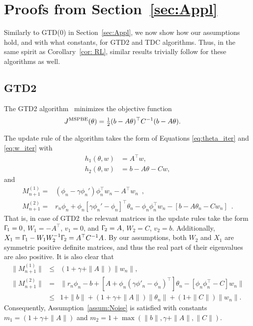 \documentclass[usenames,dvipsnames,final,12pt]{colt2018} %
\newcommand{\bE}{\mathbb{E}}
\newcommand{\Xt}{X_1}
\newcommand{\Wt}{W_1}
\newcommand{\Tt}{\Upgamma_1}
\newcommand{\Mt}{M^{(1)}}
\newcommand{\mt}{m_1}
\newcommand{\Tw}{\Upgamma_2}
\newcommand{\Ww}{W_2}
\newcommand{\Mw}{M^{(2)}}
\newcommand{\mw}{m_2}
\newcommand{\gal}[1]{#1}
\begin{document}
\section{Proofs from Section~\ref{sec:Appl}} \label{sec: RL appendix}
\gal{Similarly to GTD(0) in Section~\ref{sec:Appl}, we now show how our assumptions hold, and with what constants, for GTD2 and TDC algorithms. Thus, in the same spirit as Corollary~\ref{cor: RL}, similar results trivially follow for these algorithms as well.}
\subsection{GTD2}
The GTD2 \; algorithm~\citep{sutton2009fast} minimizes the objective function
\begin{align}
J^{\rm MSPBE}(\theta)
&=
\tfrac{1}{2}(b-A\theta)^\top C^{-1}(b-A\theta).
\label{eq: MSPBE}
\enspace
\end{align}

The update rule of the algorithm takes the form of Equations \eqref{eq:theta_iter} and \eqref{eq:w_iter} with
\begin{align*}
h_1(\theta,w)  &= %
A^\top w,
\\
h_2(\theta,w)  &= %
b-A\theta -Cw,
\end{align*}
and
\begin{align*}
\Mt_{n+1} =& \left(\phi_n - \gamma \phi_n'\right)\phi_n^\top w_n - A^\top w_n \enspace,
\\
\Mw_{n+1} %
=& r_n\phi_n + \phi_n[\gamma\phi_n'-\phi_n]^\top\theta_n - \phi_n\phi_n^\top w_n - [b-A\theta_n -Cw_n]\enspace.
\end{align*}
That is, in case of GTD2\ the relevant matrices in the update rules take the form
$\Tt = 0$, $\Wt = -A^\top$, $v_1 = 0$, and $\Tw=A$, $\Ww=C$, $v_2=b$.
Additionally, $\Xt = \Tt - \Wt\Ww^{-1}\Tw = A^\top C^{-1} A$.
By our assumptions, both $\Ww$ and $\Xt$ are symmetric positive definite matrices, and thus the real part of their eigenvalues are also positive.
%
It is also clear that
%
\begin{eqnarray*}
\|\Mt_{n+1}\| & \leq& (1+\gamma+\|A\|) \|w_n\| ,\\
\|\Mw_{n+1}\| & = & \|r_n\phi_n-b+[A+\phi_n(\gamma\phi'_n-\phi_n)^\top]\theta_n - [\phi_n\phi_n^\top-C] w_n\|\\
& \leq & 1+\|b\| + (1+\gamma+\|A\|)\|\theta_n\| + (1+\|C\|)\|w_n\|.
\end{eqnarray*}
%
Consequently, Assumption~\ref{assum:Noise} is satisfied with constants $\mt = (1+\gamma+\|A\|)$ and $\mw = 1 + \max(\|b\|,\gamma+\|A\|,\|C\|)$.
\end{document}
